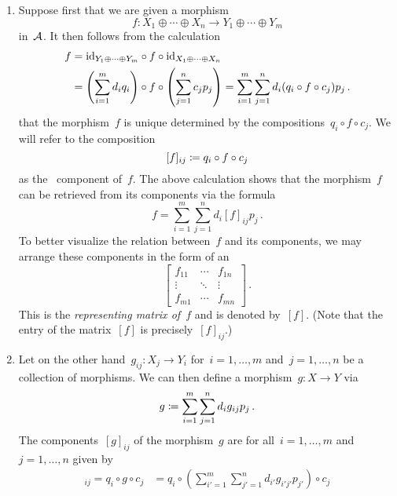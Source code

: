 \begin{remark*}
  \begin{enumerate}
    \item
      Suppose first that we are given a morphism
      \[
                f
        \colon  X_1 \oplus \dotsb \oplus X_n
        \to     Y_1 \oplus \dotsb \oplus Y_m
      \]
      in~$\mathcal{A}$.
      It then follows from the calculation
      \begin{align*}
            f
        &=  {\operatorname{id}_{Y_1 \oplus \dotsb \oplus Y_m}} \circ f \circ {\operatorname{id}_{X_1 \oplus \dotsb \oplus X_n}} \\
        &=  \left( \sum_{i=1}^m d_i q_i \right) \circ f \circ \left( \sum_{j=1}^n c_j p_j \right)
        =  \sum_{i=1}^m \sum_{j=1}^n d_i (q_i \circ f \circ c_j) p_j \,.
      \end{align*}
      that the morphism~$f$ is unique determined by the compositions~$q_i \circ f \circ c_j$.
      We will refer to the composition
      \[
                  [f]_{ij}
        \coloneqq  q_i \circ f \circ c_j
      \]
      as the~ component of~$f$.
      The above calculation shows that the morphism~$f$ can be retrieved from its components via the formula
      \[
        f = \sum_{i=1}^m \sum_{j=1}^n d_i [f]_{ij} p_j \,.
      \]
      To better visualize the relation between~$f$ and its components, we may arrange these components in the form of an~
      \[
        \begin{bmatrix}
          f_{11}  & \cdots  & f_{1n}  \\
          \vdots  & \ddots  & \vdots  \\
          f_{m1}  & \cdots  & f_{mn}
        \end{bmatrix} \,.
      \]
      This is the \emph{representing matrix of~$f$} and is denoted by~$[f]$.
      (Note that the~ entry of the matrix~$[f]$ is precisely~$[f]_{ij}$.)
    \item
      Let on the other hand~$g_{ij} \colon X_j \to Y_i$ for~$i = 1, \dotsc, m$ and~$j = 1, \dotsc, n$ be a collection of morphisms.
      We can then define a morphism~$g \colon X \to Y$ via
      \[
                  g
        \coloneqq  \sum_{i=1}^m \sum_{j=1}^n d_i g_{ij} p_j \,.
      \]
      The components~$[g]_{ij}$ of the morphism~$g$ are for all~$i = 1, \dotsc, m$ and~$j = 1, \dotsc, n$ given by
      \begin{align*}
            [g]_{ij}
        =  q_i \circ g \circ c_j
        &=  q_i \circ \left( \sum_{i'=1}^m \sum_{j'=1}^n d_{i'} g_{i'j'} p_{j'} \right) \circ c_j \\

\end{align*}
\end{enumerate}
\end{remark*}
